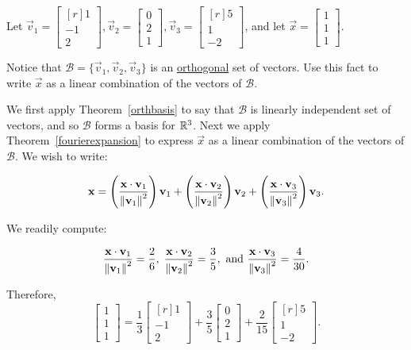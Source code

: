 \documentclass{ximera}
\begin{document}
\begin{example}\label{fourier}
Let
$\vec{v}_1= \begin{bmatrix}[r]
1 \\ -1 \\ 2
\end{bmatrix},
\vec{v}_2= \begin{bmatrix}
0 \\ 2 \\ 1 
\end{bmatrix},
\vec{v}_3 =\begin{bmatrix}[r]
5 \\ 1 \\ -2
\end{bmatrix}$,
and let
$\vec{x} =\begin{bmatrix}
1 \\ 1 \\ 1
\end{bmatrix}$.  

Notice that $\mathcal{B}=\{ \vec{v}_1, \vec{v}_2, \vec{v}_3\}$
is an \underline{orthogonal} set of vectors.  Use this fact to write $\vec{x}$ as  a linear combination of the vectors of $\mathcal{B}$.

\begin{explanation}
We first apply Theorem~\ref{orthbasis} to say that $\mathcal{B}$ is linearly independent set of vectors, and so $\mathcal{B}$ forms a basis for $\mathbb{R}^3$. Next we apply Theorem~\ref{fourierexpansion} to express $\vec{x}$ as  a linear combination of the vectors of $\mathcal{B}$.  We wish to write:

\[
\mathbf{x}   =
\left(\frac{\mathbf{x}\cdot \mathbf{v}_1}{\left\lVert\mathbf{v}_1\right\rVert^2}\right) \mathbf{v}_1 +
\left(\frac{\mathbf{x}\cdot \mathbf{v}_2}{\left\lVert\mathbf{v}_2\right\rVert^2}\right) \mathbf{v}_2 +
\left(\frac{\mathbf{x}\cdot \mathbf{v}_3}{\left\lVert\mathbf{v}_3\right\rVert^2}\right) \mathbf{v}_3.
\]

We readily compute:

\[
\frac{\mathbf{x}\cdot\mathbf{v}_1}{\left\lVert\mathbf{v}_1\right\rVert^2} = \frac{2}{6}, \;
\frac{\mathbf{x}\cdot\mathbf{v}_2}{\left\lVert\mathbf{v}_2\right\rVert^2} = \frac{3}{5},
\mbox{ and }
\frac{\mathbf{x}\cdot\mathbf{v}_3}{\left\lVert\mathbf{v}_3\right\rVert^2} = \frac{4}{30}.\]

Therefore,
\[ \begin{bmatrix}
1 \\ 1 \\ 1
\end{bmatrix}
= \frac{1}{3}\begin{bmatrix}[r]
1 \\ -1 \\ 2
\end{bmatrix}
+\frac{3}{5}\begin{bmatrix}
0 \\ 2 \\ 1
\end{bmatrix}
+\frac{2}{15}\begin{bmatrix}[r]
5 \\ 1 \\ -2
\end{bmatrix}.\]
\end{explanation} 
\end{example}
\end{document}
